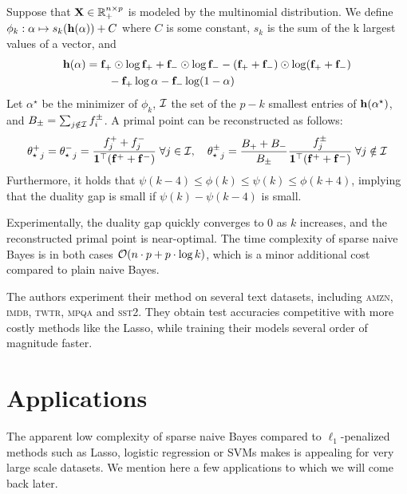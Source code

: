 \begin{theorem}
Suppose that $\mathbf{X} \in \mathbb{R}_+^{n \times p}$ is modeled by the multinomial distribution.
We define $\phi_k : \alpha \mapsto s_k(\mathbf{h}(\alpha)) + C$ where $C$ is some constant,
$s_k$ is the sum of the k largest values of a vector, and
\begin{equation*}
        \begin{split}
                \mathbf{h}(\alpha) &= \mathbf{f}_+ \odot \log \mathbf{f}_+ + \mathbf{f}_- \odot \log \mathbf{f}_-
                                - (\mathbf{f}_+ + \mathbf{f}_-) \odot \log (\mathbf{f}_+ + \mathbf{f}_-)\\
                        &\qquad - \mathbf{f}_+ \log \alpha - \mathbf{f}_- \log (1 - \alpha)
        \end{split}
\end{equation*}
Let $\alpha^\star$ be the minimizer of $\phi_k$, $\mathcal{I}$ the set of the $p - k$ smallest entries of
$\mathbf{h}(\alpha^\star)$, and $B_\pm = \sum_{j \notin \mathcal{I}} f_i^\pm$.
A primal point can be reconstructed as follows:
\[
        {\theta^+_\star}_j = {\theta^-_\star}_j = \frac{f_j^+ + f_j^-}{\mathbf{1}^\top(\mathbf{f}^+ + \mathbf{f}^-)}
        \;\forall j \in \mathcal{I}
        ,\quad
        {\theta^\pm_\star}_j = \frac{B_+ + B_-}{B_\pm}\frac{f^\pm_j}{\mathbf{1}^\top(\mathbf{f}^+ + \mathbf{f}^-)}
        \;\forall j \notin \mathcal{I}
\]
Furthermore, it holds that $\psi(k - 4) \leq \phi(k) \leq \psi(k) \leq \phi(k + 4)$,
implying that the duality gap is small if $\psi(k) - \psi(k - 4)$ is small.
\end{theorem}
Experimentally, the duality gap quickly converges to $0$ as $k$ increases,
and the reconstructed primal point is near-optimal.
The time complexity of sparse naive Bayes is in both cases $\mathcal{O}(n \cdot p + p \cdot \log k)$,
which is a minor additional cost compared to plain naive Bayes.

The authors experiment their method on several text datasets,
including \textsc{amzn}, \textsc{imdb}, \textsc{twtr}, \textsc{mpqa} and \textsc{sst2}.
They obtain test accuracies competitive with more costly methods like the Lasso,
while training their models several order of magnitude faster.

\section{Applications}\label{sec:nb_app}

The apparent low complexity of sparse naive Bayes compared to $\ell_1$-penalized methods such as
Lasso, logistic regression or SVMs makes is appealing for very large scale datasets.
We mention here a few applications to which we will come back later.


